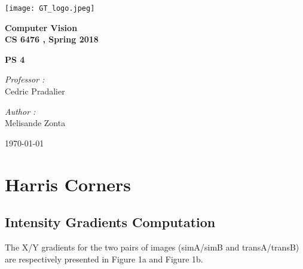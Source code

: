 \documentclass[a4paper,11pt]{article}
\begin{document}

\begin{titlepage}

\begin{center}
\texttt{[image: GT\_logo.jpeg]}
\end{center}
\hrulefill
\begin{center}\bfseries\huge
   Computer Vision \\
   CS 6476 , Spring 2018\\
   \end{center}
  \begin{center}\bfseries\large
     PS 4\\
    \hrulefill
\end{center}
\vspace*{1cm}
\begin{minipage}[t]{0.6\textwidth}
  \begin{flushleft} \large
    \emph{Professor : }\\
    Cedric Pradalier \\
  \end{flushleft}
\end{minipage}
\begin{minipage}[t]{0.3\textwidth}
  \begin{flushright} \large
    \emph{Author :} \\
    Melisande Zonta \\
  \end{flushright}
\end{minipage}
\begin{flushright}
       \today 
\end{flushright} 
\end{titlepage}

\tableofcontents
\clearpage




\section{Harris Corners}

\subsection{Intensity Gradients Computation}


The X/Y gradients for the two pairs of images (simA/simB and transA/transB) are respectively presented in Figure 1a and Figure 1b.
\end{document}

